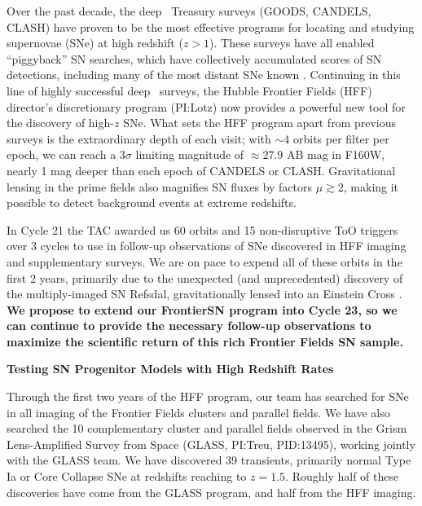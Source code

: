 \documentclass[12pt]{article}
\begin{document}
%
%
\justification          %

Over the past decade, the deep \HST\ Treasury surveys (GOODS, CANDELS,
CLASH) have proven to be the most effective programs for locating and
studying supernovae (SNe) at high redshift ($z>1$).  These surveys
have all enabled ``piggyback'' SN searches, which have collectively
accumulated scores of SN detections, including many of the most
distant SNe known
\citep{Riess:2007,Dahlen:2008,Graur:2014,Rodney:2014}.  Continuing in
this line of highly successful deep \HST\ surveys, the Hubble Frontier
Fields (HFF) director's discretionary program (PI:Lotz) now provides a
powerful new tool for the discovery of high-$z$ SNe.  What sets the
HFF program apart from previous surveys is the extraordinary depth of
each visit; with $\sim$4 orbits per filter per epoch, we can reach a
$3\sigma$ limiting magnitude of $\approx27.9$ AB mag in F160W, nearly
1 mag deeper than each epoch of CANDELS or CLASH. Gravitational lensing in
the prime fields also magnifies SN fluxes by factors $\mu\gtrsim2$,
making it possible to detect background events at extreme redshifts.

In Cycle 21 the TAC awarded us 60 orbits and 15 non-disruptive ToO
triggers over 3 cycles to use in follow-up observations of SNe
discovered in HFF imaging and supplementary surveys. We are on pace to
expend all of these orbits in the first 2 years, primarily due to the
unexpected (and unprecedented) discovery of the multiply-imaged SN
Refsdal, gravitationally lensed into an Einstein Cross
\citep{Kelly:2015}.  {\bf We propose to extend our FrontierSN program
  into Cycle 23, so we can continue to provide the necessary follow-up
  observations to maximize the scientific return of this rich Frontier
  Fields SN sample.}

\bigskip
\centerline {\bf Testing SN Progenitor Models with High Redshift Rates} 
\medskip

Through the first two years of the HFF program, our team has searched
for SNe in all imaging of the Frontier Fields clusters and parallel
fields.  We have also searched the 10 complementary cluster and
parallel fields observed in the Grism Lens-Amplified Survey from Space
(GLASS, PI:Treu, PID:13495), working jointly with the GLASS team.  We
have discovered 39 transients, primarily normal Type Ia or Core
Collapse SNe at redshifts reaching to $z=1.5$.  Roughly half of these
discoveries have come from the GLASS program, and half from the HFF
imaging.
\end{document}
